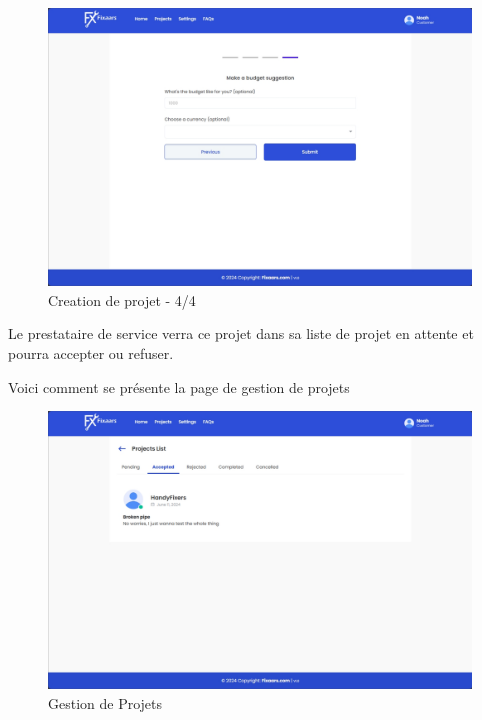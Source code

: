 {\vspace{0.35cm}
\begin{figure}[H]
\begin{center}
\includegraphics[width=12cm]{assets/demo/setup-4.png}
\end{center}
\caption{Creation de projet - 4/4}
\end{figure}

Le prestataire de service verra ce projet dans sa liste de projet en attente et pourra accepter ou refuser. 

\vspace{0.35cm}

Voici comment se présente la page de gestion de projets 

\vspace{0.35cm}
\begin{figure}[H]
\begin{center}
\includegraphics[width=12cm]{assets/demo/pj-list.png}
\end{center}
\caption{Gestion de Projets}
\end{figure}

}
